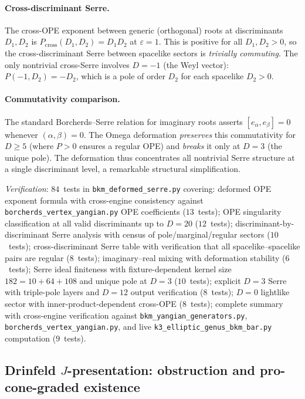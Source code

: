 \paragraph{Cross-discriminant Serre.}
The cross-OPE exponent between generic (orthogonal) roots at discriminants $D_1, D_2$
is $P_{\mathrm{cross}}(D_1, D_2) = D_1 D_2$ at $\varepsilon = 1$. This is positive
for all $D_1, D_2 > 0$, so the cross-discriminant Serre between spacelike sectors is
\emph{trivially commuting}. The only nontrivial cross-Serre involves $D = -1$
(the Weyl vector): $P(-1, D_2) = -D_2$, which is a pole of order $D_2$ for each
spacelike $D_2 > 0$.

\paragraph{Commutativity comparison.}
The standard Borcherds--Serre relation for imaginary roots asserts
$[e_\alpha, e_\beta] = 0$ whenever $(\alpha, \beta) = 0$. The Omega deformation
\emph{preserves} this commutativity for $D \geq 5$ (where $P > 0$ ensures a regular
OPE) and \emph{breaks} it only at $D = 3$ (the unique pole). The deformation thus
concentrates all nontrivial Serre structure at a single discriminant level, a
remarkable structural simplification.

\noindent\textit{Verification}: $84$~tests in \texttt{bkm\_deformed\_serre.py}
covering: deformed OPE exponent formula with cross-engine consistency against
\texttt{borcherds\_vertex\_yangian.py} OPE coefficients ($13$~tests); OPE singularity
classification at all valid discriminants up to $D = 20$ ($12$~tests); discriminant-by-discriminant
Serre analysis with census of pole/marginal/regular sectors ($10$~tests); cross-discriminant
Serre table with verification that all spacelike--spacelike pairs are regular ($8$~tests);
imaginary--real mixing with deformation stability ($6$~tests); Serre ideal finiteness
with fixture-dependent kernel size $182 = 10 + 64 + 108$ and unique pole at $D = 3$ ($10$~tests);
explicit $D = 3$ Serre with triple-pole layers and $D = 12$ output verification
($8$~tests); $D = 0$ lightlike sector with inner-product-dependent cross-OPE ($8$~tests);
complete summary with cross-engine verification against \texttt{bkm\_yangian\_generators.py},
\texttt{borcherds\_vertex\_yangian.py}, and live \texttt{k3\_elliptic\_genus\_bkm\_bar.py}
computation ($9$~tests).

\subsection{Drinfeld \texorpdfstring{$J$}{J}-presentation: obstruction and pro-cone-graded existence}
\label{subsec:k3e-drinfeld-J-presentation}

